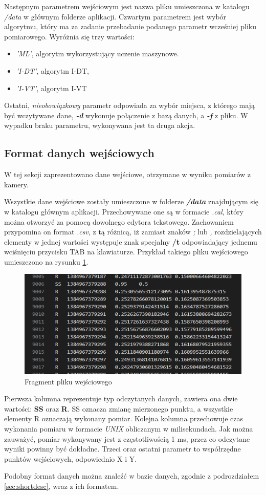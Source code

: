 Następnym parametrem wejściowym jest nazwa pliku umieszczona w katalogu \emph{/data} w głównym folderze aplikacji. Czwartym parametrem jest wybór algorytmu, który ma za zadanie przebadanie podanego parametr wcześniej pliku pomiarowego. Wyróżnia się trzy wartości:
\begin{itemize}
        \item \emph{'ML'}, algorytm wykorzystujący uczenie maszynowe.
        \item \emph{'I-DT'}, algorytm I-DT,
        \item \emph{'I-VT'}, algorytm I-VT
\end{itemize}
Ostatni, \emph{nieobowiązkowy} parametr odpowiada za wybór miejsca, z którego mają być wczytywane dane, \emph{\textbf{-d}} wykonuje połączenie z bazą danych, a \emph{\textbf{-f}} z pliku. W wypadku braku parametru, wykonywana jest ta druga akcja.
\subsection{Format danych wejściowych}
\label{ssec:importdata}
W tej sekcji zaprezentowano dane wejściowe, otrzymane w wyniku pomiarów z kamery.\par
Wszystkie dane wejściowe zostały umieszczone w folderze \emph{\textbf{/data}} znajdującym się w katalogu głównym aplikacji. Przechowywane one są w formacie \emph{.cal}, który można otworzyć za pomocą dowolnego edytora tekstowego. Zachowaniem przypomina on format \emph{.csv}, z tą różnicą, iż zamiast znaków \emph{;} lub \emph{,} rozdzielających elementy w jednej wartości występuje znak specjalny \textbf{/t} odpowiadający jednemu wciśnięciu przycisku TAB na klawiaturze. Przykład takiego pliku wejściowego umieszczono na rysunku \ref{fig:plikwejsciowy}.
\begin{figure}[H]
        \centering
        \captionsetup{justification=centering,margin=2cm}
        \includegraphics[width=0.8\linewidth]{resources/plikwejsciowy.png}
        \caption{Fragment pliku wejściowego}
        \label{fig:plikwejsciowy}
\end{figure}
Pierwsza kolumna reprezentuje typ odczytanych danych, zawiera ona dwie wartości: \textbf{SS} oraz \textbf{R}. SS oznacza zmianę mierzonego punktu, a wszystkie elementy R oznaczają wykonany pomiar. Kolejna kolumna przechowuje czas wykonania pomiaru w formacie \emph{UNIX} obliczanym w milisekundach. Jak można zauważyć, pomiar wykonywany jest z częstotliwością 1 ms, przez co odczytane wyniki powinny być dokładne. Trzeci oraz ostatni parametr to współrzędne punktów wejściowych, odpowiednio X i Y.\par
Podobny format danych można znaleźć w bazie danych, zgodnie z podrozdziałem \ref{sec:shortdesc}, wraz z ich formatem.
